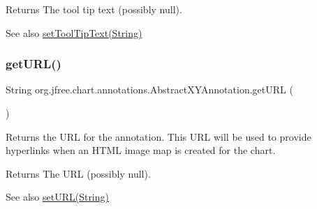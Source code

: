 \begin{DoxyReturn}{Returns}
The tool tip text (possibly {\ttfamily null}).
\end{DoxyReturn}
\begin{DoxySeeAlso}{See also}
\mbox{\hyperlink{classorg_1_1jfree_1_1chart_1_1annotations_1_1_abstract_x_y_annotation_a8dbccbba7b65f42906aa5dda54ff1335}{set\+Tool\+Tip\+Text(\+String)}} 
\end{DoxySeeAlso}
\mbox{\label{classorg_1_1jfree_1_1chart_1_1annotations_1_1_abstract_x_y_annotation_af3c7b1a1f7270c9a6d057adbb9e1e6f1}} 
\subsubsection{\texorpdfstring{get\+U\+R\+L()}{getURL()}}
{\footnotesize\ttfamily String org.\+jfree.\+chart.\+annotations.\+Abstract\+X\+Y\+Annotation.\+get\+U\+RL (\begin{DoxyParamCaption}{ }\end{DoxyParamCaption})}

Returns the U\+RL for the annotation. This U\+RL will be used to provide hyperlinks when an H\+T\+ML image map is created for the chart.

\begin{DoxyReturn}{Returns}
The U\+RL (possibly {\ttfamily null}).
\end{DoxyReturn}
\begin{DoxySeeAlso}{See also}
\mbox{\hyperlink{classorg_1_1jfree_1_1chart_1_1annotations_1_1_abstract_x_y_annotation_a3d06b6d644ba7bc73eaacb44ea033fcb}{set\+U\+R\+L(\+String)}} 
\end{DoxySeeAlso}
\mbox{\label{classorg_1_1jfree_1_1chart_1_1annotations_1_1_abstract_x_y_annotation_a47db97c04a85bdd2c90720d2f7a743a2}} 
